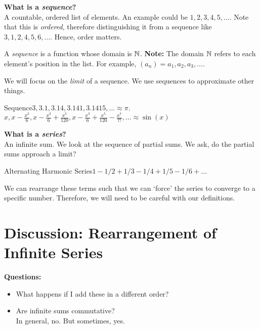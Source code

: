 \textbf{What is a \textit{sequence}?} \\

A countable, ordered list of elements. An example could be $1,2,3,4,5,\dots$. Note that this is \textit{ordered}, therefore distinguishing it from a sequence like $3,1,2,4,5,6,\dots$. Hence, order matters.

A \textit{sequence} is a function whose domain is $\mathbb{N}$. \textbf{Note:} The domain $\mathbb{N}$ refers to each element's position in the list. For example, $(a_n) = a_1,a_2,a_3,\dots$.

We will focus on the \textit{limit} of a sequence. We use sequences to approximate other things.

\begin{example}
    {Sequence}$3,3.1,3.14,3.141,3.1415,\dots \approx \pi$. \\
    $x, x - \frac{x^3}{6}, x - \frac{x^3}{6} + \frac{x^5}{120}, x - \frac{x^3}{6} + \frac{x^5}{120} - \frac{x^7}{7!}, \dots \approx \sin(x)$
\end{example}

\noindent\textbf{What is a \textit{series}?} \\

An infinite sum. We look at the sequence of partial sums. We ask, do the partial sums approach a limit?

\begin{example}
    {Alternating Harmonic Series}$1 - 1/2 + 1/3 - 1/4 + 1/5 - 1/6 + \dots$
\end{example}

We can rearrange these terms such that we can `force' the series to converge to a specific number. Therefore, we will need to be careful with our definitions.

\section{Discussion: Rearrangement of Infinite Series}

\noindent \textbf{Questions:}

\begin{itemize}
    \item What happens if I add these in a different order?
    \item Are infinite sums commutative? \\
          In general, no. But sometimes, yes.
\end{itemize}

